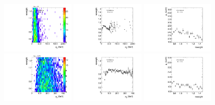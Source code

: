 \begin{figure}[htbp!]
\begin{center}
\includegraphics[width=0.32\textwidth,angle=-90]{figures/boosted/AppendixReweight/Weights/4Trk_Sideband_leadHCand_trk0_Pt_weight.pdf}
\includegraphics[width=0.32\textwidth,angle=-90]{figures/boosted/AppendixReweight/Weights/4Trk_Sideband_leadHCand_trk0_Pt_weight_profx.pdf}
\includegraphics[width=0.32\textwidth,angle=-90]{figures/boosted/AppendixReweight/Weights/4Trk_Sideband_leadHCand_trk0_Pt_weight_profy.pdf}\\
\includegraphics[width=0.32\textwidth,angle=-90]{figures/boosted/AppendixReweight/Weights/4Trk_Sideband_sublHCand_trk0_Pt_weight.pdf}
\includegraphics[width=0.32\textwidth,angle=-90]{figures/boosted/AppendixReweight/Weights/4Trk_Sideband_sublHCand_trk0_Pt_weight_profx.pdf}
\includegraphics[width=0.32\textwidth,angle=-90]{figures/boosted/AppendixReweight/Weights/4Trk_Sideband_sublHCand_trk0_Pt_weight_profy.pdf}\\

\end{center}
\end{figure}
